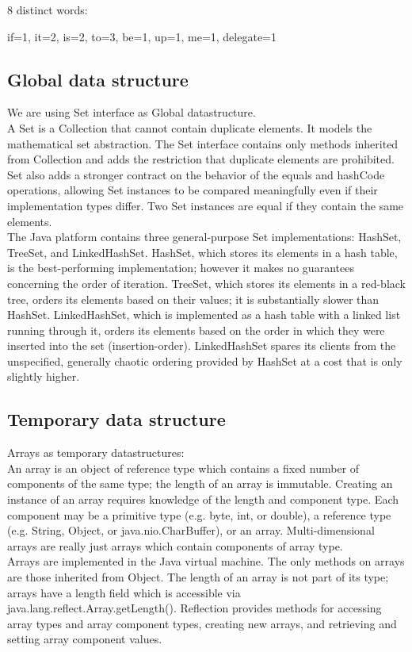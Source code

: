 \documentclass[oneside,a4paper,12pt]{report}
\begin{document}
8 distinct words: {if=1, it=2, is=2, to=3, be=1, up=1, me=1, delegate=1



\subsection{Global data structure}
We are using Set interface as Global datastructure.\\
	A Set is a Collection that cannot contain duplicate elements. It models the mathematical set abstraction. The Set interface contains only methods inherited from Collection and adds the restriction that duplicate elements are prohibited. Set also adds a stronger contract on the behavior of the equals and hashCode operations, allowing Set instances to be compared meaningfully even if their implementation types differ. Two Set instances are equal if they contain the same elements.\\
The Java platform contains three general-purpose Set implementations: HashSet, TreeSet, and LinkedHashSet. HashSet, which stores its elements in a hash table, is the best-performing implementation; however it makes no guarantees concerning the order of iteration. TreeSet, which stores its elements in a red-black tree, orders its elements based on their values; it is substantially slower than HashSet. LinkedHashSet, which is implemented as a hash table with a linked list running through it, orders its elements based on the order in which they were inserted into the set (insertion-order). LinkedHashSet spares its clients from the unspecified, generally chaotic ordering provided by HashSet at a cost that is only slightly higher.


\subsection{Temporary data structure}
Arrays as temporary datastructures: \\
An array is an object of reference type which contains a fixed number of components of the same type; the length of an array is immutable. Creating an instance of an array requires knowledge of the length and component type. Each component may be a primitive type (e.g. byte, int, or double), a reference type (e.g. String, Object, or java.nio.CharBuffer), or an array. Multi-dimensional arrays are really just arrays which contain components of array type. \\
Arrays are implemented in the Java virtual machine. The only methods on arrays are those inherited from Object. The length of an array is not part of its type; arrays have a length field which is accessible via java.lang.reflect.Array.getLength().
Reflection provides methods for accessing array types and array component types, creating new arrays, and retrieving and setting array component values.

}
\end{document}
